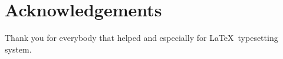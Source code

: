 \chapter*{Acknowledgements}

Thank you for everybody that helped and especially for \LaTeX\ typesetting system.
